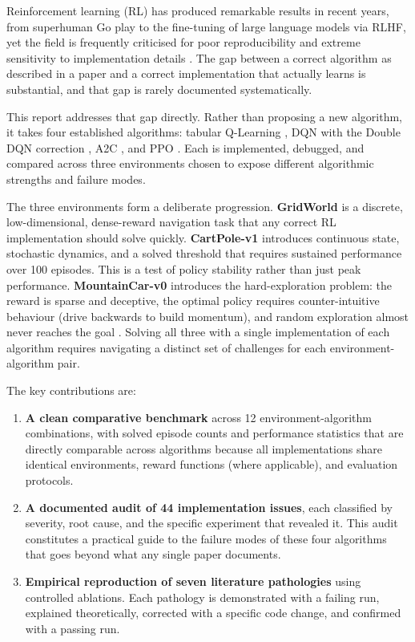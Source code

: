 \documentclass[a4paper,12pt]{article}
\begin{document}
Reinforcement learning (RL) has produced remarkable results in recent years, from superhuman Go play \cite{silver2021reward} to the fine-tuning of large language models via RLHF, yet the field is frequently criticised for poor reproducibility and extreme sensitivity to implementation details \cite{henderson2018deep,engstrom2020implementation}. The gap between a correct algorithm as described in a paper and a correct implementation that actually learns is substantial, and that gap is rarely documented systematically.

This report addresses that gap directly. Rather than proposing a new algorithm, it takes four established algorithms: tabular Q-Learning \cite{watkins1992q}, DQN \cite{mnih2015human} with the Double DQN correction \cite{van2016deep}, A2C \cite{mnih2016asynchronous}, and PPO \cite{schulman2017proximal}. Each is implemented, debugged, and compared across three environments chosen to expose different algorithmic strengths and failure modes.

The three environments form a deliberate progression. \textbf{GridWorld} is a discrete, low-dimensional, dense-reward navigation task that any correct RL implementation should solve quickly. \textbf{CartPole-v1} introduces continuous state, stochastic dynamics, and a solved threshold that requires sustained performance over 100 episodes. This is a test of policy stability rather than just peak performance. \textbf{MountainCar-v0} introduces the hard-exploration problem: the reward is sparse and deceptive, the optimal policy requires counter-intuitive behaviour (drive backwards to build momentum), and random exploration almost never reaches the goal \cite{dann2022exploration}. Solving all three with a single implementation of each algorithm requires navigating a distinct set of challenges for each environment-algorithm pair.

The key contributions are:

\begin{enumerate}
  \item \textbf{A clean comparative benchmark} across 12 environment-algorithm combinations, with solved episode counts and performance statistics that are directly comparable across algorithms because all implementations share identical environments, reward functions (where applicable), and evaluation protocols.

  \item \textbf{A documented audit of 44 implementation issues}, each classified by severity, root cause, and the specific experiment that revealed it. This audit constitutes a practical guide to the failure modes of these four algorithms that goes beyond what any single paper documents.

  \item \textbf{Empirical reproduction of seven literature pathologies} using controlled ablations. Each pathology is demonstrated with a failing run, explained theoretically, corrected with a specific code change, and confirmed with a passing run.
\end{enumerate}
\end{document}
